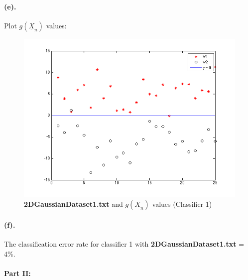 \documentclass[a4paper]{article}
\begin{document}
\paragraph{(e).} Plot $g(\underline{X}_{n})$ values: \\
\begin{figure}[H]
  \centering
    \includegraphics[scale=.6]{images/1_e.png}
  \caption{\textbf{2DGaussianDataset1.txt} and $g(\underline{X}_{n})$ values (Classifier 1)}
\end{figure}

\paragraph{(f).} The classification error rate for classifier 1 with \textbf{2DGaussianDataset1.txt} = 4\%.

\paragraph{Part II:}
\end{document}
